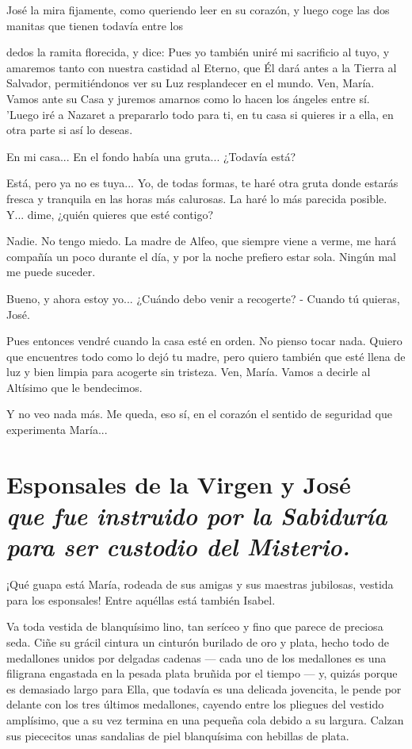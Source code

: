 \documentclass[12pt]{book} %
\begin{document}
José la mira fijamente, como queriendo leer en su corazón, y luego coge las dos manitas que tienen todavía entre los 

dedos la ramita florecida, y dice: Pues yo también uniré mi sacrificio al tuyo, y amaremos tanto con nuestra castidad al Eterno, que Él dará antes a la Tierra al Salvador, permitiéndonos ver su Luz resplandecer en el mundo. Ven, María. Vamos ante su Casa y juremos amarnos como lo hacen los ángeles entre sí. 'Luego iré a Nazaret a prepararlo todo para ti, en tu casa si quieres ir a ella, en otra parte si así lo deseas. 

En mi casa... En el fondo había una gruta... ¿Todavía está? 

Está, pero ya no es tuya... Yo, de todas formas, te haré otra gruta donde estarás fresca y tranquila en las horas más calurosas. La haré lo más parecida posible. Y... dime, ¿quién quieres que esté contigo? 

Nadie. No tengo miedo. La madre de Alfeo, que siempre viene a verme, me hará compañía un poco durante el día, y por la noche prefiero estar sola. Ningún mal me puede suceder. 

Bueno, y ahora estoy yo... ¿Cuándo debo venir a recogerte? - Cuando tú quieras, José. 

Pues entonces vendré cuando la casa esté en orden. No pienso tocar nada. Quiero que encuentres todo como lo dejó tu madre, pero quiero también que esté llena de luz y bien limpia para acogerte sin tristeza. Ven, María. Vamos a decirle al Altísimo que le bendecimos. 

Y no veo nada más. Me queda, eso sí, en el corazón el sentido de seguridad que experimenta María... 
 
\chapter*{Esponsales de la Virgen y José \\ \normalfont\normalsize\textit{que fue instruido por la Sabiduría para ser custodio del Misterio.}}
 
¡Qué guapa está María, rodeada de sus amigas y sus maestras jubilosas, vestida para los esponsales! Entre aquéllas está también Isabel. 

Va toda vestida de blanquísimo lino, tan seríceo y fino que parece de preciosa seda. Ciñe su grácil cintura un cinturón burilado de oro y plata, hecho todo de medallones unidos por delgadas cadenas — cada uno de los medallones es una filigrana engastada en la pesada plata bruñida por el tiempo — y, quizás porque es demasiado largo para Ella, que todavía es una delicada jovencita, le pende por delante con los tres últimos medallones, cayendo entre los pliegues del vestido amplísimo, que a su vez termina en una pequeña cola debido a su largura. Calzan sus piececitos unas sandalias de piel blanquísima con hebillas de plata. 
\end{document}
